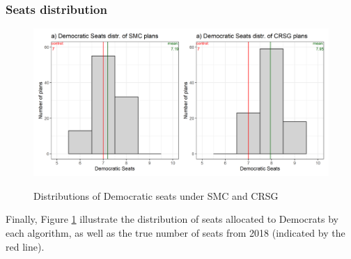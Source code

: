\subsubsection{Seats distribution}

\begin{figure}
    \centering
    \caption{Distributions of Democratic seats under SMC and CRSG}
    \includegraphics[width=\textwidth]{img/dseats.hist.png}
    \label{fig:dseats.hist}
    \raggedright
\end{figure}

Finally, Figure \ref{fig:dseats.hist} illustrate the distribution of seats allocated to Democrats by each algorithm, as well as the true number of seats from 2018 (indicated by the red line). 